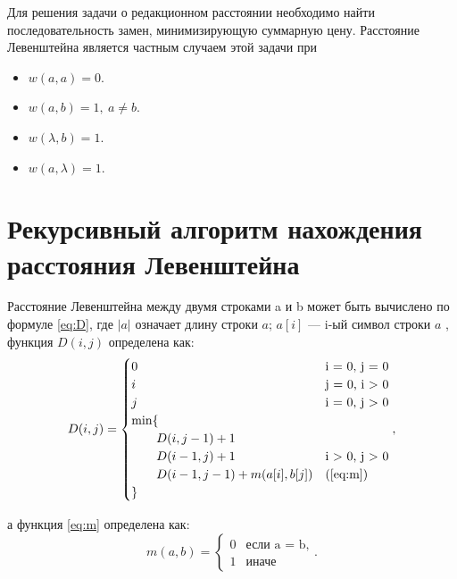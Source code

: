 \documentclass[12pt]{report}
\begin{document}
Для решения задачи о редакционном расстоянии необходимо найти последовательность замен, минимизирующую суммарную цену. Расстояние Левенштейна является частным случаем этой задачи при

\begin{itemize}
	\item $w(a,a)=0$.
	\item $w(a,b)=1, \medspace a \neq b$.
	\item $w(\lambda,b)=1$.
	\item $w(a,\lambda)=1$.
\end{itemize}

\section{Рекурсивный алгоритм нахождения расстояния Левенштейна}

Расстояние Левенштейна между двумя строками a и b может быть вычислено по формуле \ref{eq:D}, где $|a|$ означает длину строки $a$; $a[i]$ — i-ый символ строки $a$ , функция $D(i, j)$ определена как:
\begin{equation}
\label{eq:D}
D(i, j) = \begin{cases}
0 &\text{i = 0, j = 0}\\
i &\text{j = 0, i > 0}\\
j &\text{i = 0, j > 0}\\
\min \lbrace \\
\qquad D(i, j-1) + 1\\
\qquad D(i-1, j) + 1 &\text{i > 0, j > 0}\\
\qquad D(i-1, j-1) + m(a[i], b[j]) &\text(\ref{eq:m})\\
\rbrace
\end{cases},
\end{equation}

а функция \ref{eq:m} определена как:
\begin{equation}
\label{eq:m}
m(a, b) = \begin{cases}
0 &\text{если a = b,}\\
1 &\text{иначе}
\end{cases}.
\end{equation}
\end{document}
